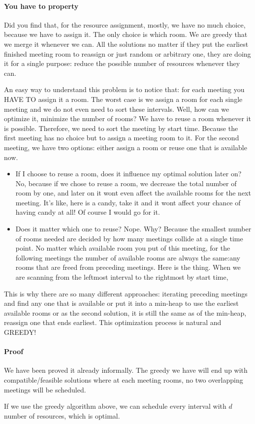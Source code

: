 \documentclass[../main.tex]{subfiles}
\begin{document}
\paragraph{You have to property} Did you find that, for the resource assignment, mostly, we have no much choice, because we have to assign it. The only choice is which room. We are greedy that we merge it whenever we can. All the solutions no matter if they put the earliest finished meeting room to reassign or just random or arbitrary one, they are doing it for a single purpose: reduce the possible number of resources whenever they can.

An easy way to understand this problem is to notice that: for each meeting you HAVE TO assign it a room. The worst case is we assign a room for each single meeting and we do not even need to sort these intervals. Well, how can we optimize it, minimize the number of rooms? We have to reuse a room whenever it is possible. Therefore, we need to sort the meeting by start time. Because the first meeting has no choice but to assign a meeting room to it. For the second meeting, we have two options: either assign a room or reuse one that is available now. 
\begin{itemize}
    \item If I choose to reuse a room, does it influence my optimal solution later on? No, because if we chose to reuse a room, we decrease the total number of room by one, and later on it wont even affect the available rooms for the next meeting. It's like, here is a candy, take it and it wont affect your chance of having candy at all! Of course I would go for it. 
\item Does it matter which one to reuse? Nope. Why? Because the smallest number of rooms needed are decided by how many meetings collide at a single time point. No matter which available room you put of this meeting, for the following meetings the number of available rooms are always the same:any rooms that are freed from preceding meetings. Here is the thing. When we are scanning from the leftmost interval to the rightmost by start time,  
\end{itemize}
This is why there are so many different approaches: iterating preceding meetings and find any one that is available or put it into a min-heap to use the earliest available rooms or as the second solution, it is still the same as of the min-heap, reassign one that ends earliest. This optimization process is natural and GREEDY!

\paragraph{Proof} We have been proved it already informally. The greedy we have will end up with compatible/feasible solutions where at each meeting rooms, no two overlapping meetings will be scheduled. 
\begin{theorem}
If we use the greedy algorithm above, we can schedule every interval with $d$ number of resources, which is optimal. 
\end{theorem}
\end{document}
